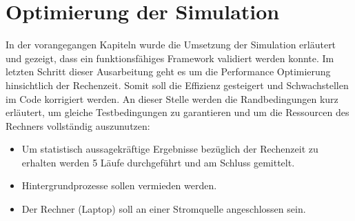 \chapter{Optimierung der Simulation}
\label{ch:opt}
In der vorangegangen Kapiteln wurde die Umsetzung der Simulation erläutert und gezeigt, dass ein funktionsfähiges Framework validiert werden konnte. Im letzten Schritt dieser Ausarbeitung geht es um die Performance Optimierung hinsichtlich der Rechenzeit. Somit soll die Effizienz gesteigert und Schwachstellen im Code korrigiert werden. An dieser Stelle werden die Randbedingungen kurz erläutert, um gleiche Testbedingungen zu garantieren und um die Ressourcen des Rechners vollständig auszunutzen:
\begin{itemize}
	\item Um statistisch aussagekräftige Ergebnisse bezüglich der Rechenzeit zu erhalten werden 5 Läufe durchgeführt und am Schluss gemittelt.
	\item Hintergrundprozesse sollen vermieden werden.
	\item Der Rechner (Laptop) soll an einer Stromquelle angeschlossen sein. 
\end{itemize}
